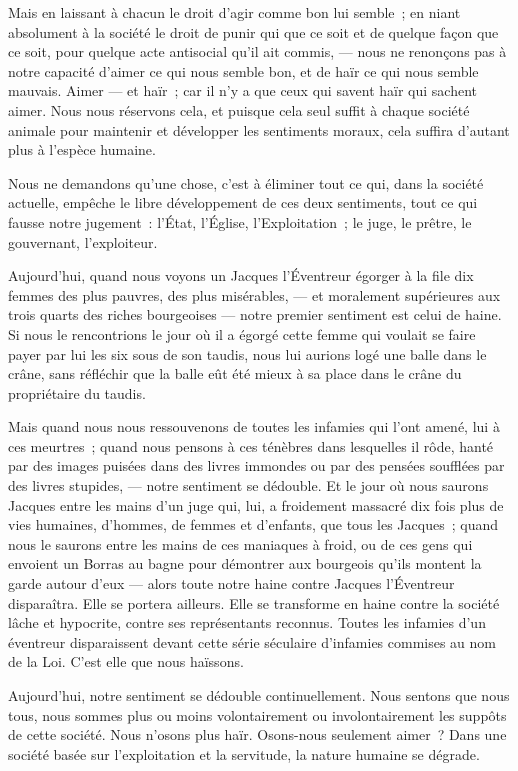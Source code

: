\documentclass[french,twoside]{book} %
\begin{document}
\bigbreak
\noindent Mais en laissant à chacun le droit d’agir comme bon lui semble ; en niant absolument à la société le droit de punir qui que ce soit et de quelque façon que ce soit, pour quelque acte antisocial qu’il ait commis, — nous ne renonçons pas à notre capacité d’aimer ce qui nous semble bon, et de haïr ce qui nous semble mauvais. Aimer — et haïr ; car il n’y a que ceux qui savent haïr qui sachent aimer. Nous nous réservons cela, et puisque cela seul suffit à chaque société animale pour maintenir et développer les sentiments moraux, cela suffira d’autant plus à l’espèce humaine.\par
Nous ne demandons qu’une chose, c’est à éliminer tout ce qui, dans la société actuelle, empêche le libre développement de ces deux sentiments, tout ce qui fausse notre jugement : l’État, l’Église, l’Exploitation ; le juge, le prêtre, le gouvernant, l’exploiteur.\par
Aujourd’hui, quand nous voyons un Jacques l’Éventreur égorger à la file dix femmes des plus pauvres, des plus misérables, — et moralement supérieures aux trois quarts des riches bourgeoises — notre premier sentiment est celui de haine. Si nous le rencontrions le jour où il a égorgé cette femme qui voulait se faire payer par lui les six sous de son taudis, nous lui aurions logé une balle dans le crâne, sans réfléchir que la balle eût été mieux à sa place dans le crâne du propriétaire du taudis.\par
Mais quand nous nous ressouvenons de toutes les infamies qui l’ont amené, lui à ces meurtres ; quand nous pensons à ces ténèbres dans lesquelles il rôde, hanté par des images puisées dans des livres immondes ou par des pensées soufflées par des livres stupides, — notre sentiment se dédouble. Et le jour où nous saurons Jacques entre les mains d’un juge qui, lui, a froidement massacré dix fois plus de vies humaines, d’hommes, de femmes et d’enfants, que tous les Jacques ; quand nous le saurons entre les mains de ces maniaques à froid, ou de ces gens qui envoient un Borras au bagne pour démontrer aux bourgeois qu’ils montent la garde autour d’eux — alors toute notre haine contre Jacques l’Éventreur disparaîtra. Elle se portera ailleurs. Elle se transforme en haine contre la société lâche et hypocrite, contre ses représentants reconnus. Toutes les infamies d’un éventreur disparaissent devant cette série séculaire d’infamies commises au nom de la Loi. C’est elle que nous haïssons.\par
\bigbreak
\noindent Aujourd’hui, notre sentiment se dédouble continuellement. Nous sentons que nous tous, nous sommes plus ou moins volontairement ou involontairement les suppôts de cette société. Nous n’osons plus haïr.  Osons-nous seulement aimer ? Dans une société basée sur l’exploitation et la servitude, la nature humaine se dégrade.\par
\end{document}
